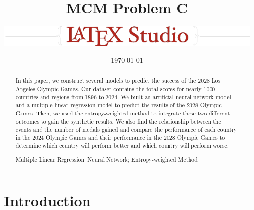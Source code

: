 \documentclass{mcmthesis}
\title{MCM Problem C}
\author{\small \href{https://www.latexstudio.net/}
  {\includegraphics{mcmthesis-logo}}}
\date{\today}
\begin{document}
\begin{abstract}
\par %




In this paper, we construct several models to predict the success of the 2028 Los Angeles Olympic Games. Our dataset contains the total scores for nearly 1000 countries and regions from 1896 to 2024. We built an artificial neural network model and a multiple linear regression model to predict the results of the 2028 Olympic Games. Then, we used the entropy-weighted method to integrate these two different outcomes to gain the synthetic results. We also find the relationship between the events and the number of medals gained and compare the performance of each country in the 2024 Olympic Games and their performance in the 2028 Olympic Games to determine which country will perform better and which country will perform worse.
\begin{keywords}
Multiple Linear Regression; Neural Network; Entropy-weighted Method
\end{keywords}
\end{abstract}
\maketitle
\tableofcontents
\newpage
\section{Introduction}
\end{document}
